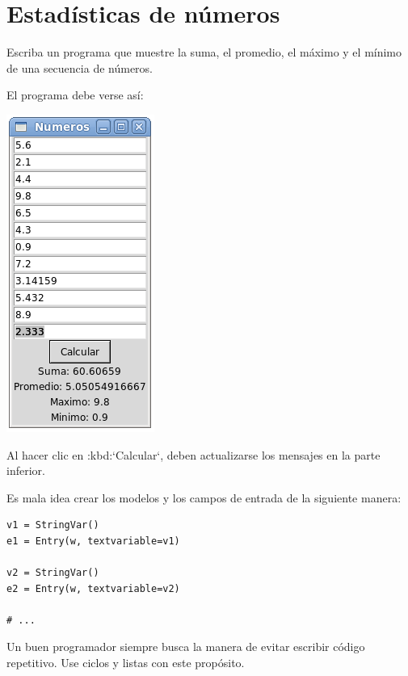 \section{Estadísticas de números}

Escriba un programa que muestre la suma, el promedio, el máximo y el
mínimo de una secuencia de números.

El programa debe verse así:

\includegraphics{../../diapos/programas/tkinter/capturas/09.png}

Al hacer clic en :kbd:`Calcular`, deben actualizarse los mensajes en la
parte inferior.

Es mala idea crear los modelos y los campos de entrada de la siguiente
manera:

\begin{lstlisting}
v1 = StringVar()
e1 = Entry(w, textvariable=v1)

v2 = StringVar()
e2 = Entry(w, textvariable=v2)

# ...
\end{lstlisting}

Un buen programador siempre busca la manera de evitar escribir código
repetitivo. Use ciclos y listas con este propósito.
